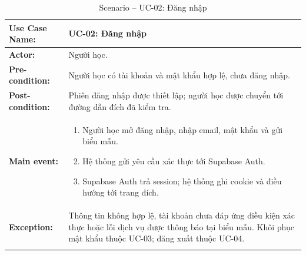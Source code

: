 \documentclass[12pt,a4paper,oneside]{report}
\newenvironment{luongusecase}{%
    \begin{enumerate}[leftmargin=1.6em,topsep=0pt,itemsep=0.25em,parsep=0pt]
}{\end{enumerate}}
\begin{document}
\begingroup
\renewcommand{\arraystretch}{1.15}
\setlength{\LTpre}{0.4em}
\setlength{\LTpost}{0.6em}
\begin{longtable}{|>{\raggedright\arraybackslash\bfseries}p{}|p{}|}
\hline
Use Case Name: & UC-02: Đăng nhập \\
\hline
Actor: & Người học. \\
\hline
Pre-condition: & Người học có tài khoản và mật khẩu hợp lệ, chưa đăng nhập. \\
\hline
Post-condition: & Phiên đăng nhập được thiết lập; người học được chuyển tới đường dẫn đích đã kiểm tra. \\
\hline
Main event: & \begin{luongusecase}
    \item Người học mở đăng nhập, nhập email, mật khẩu và gửi biểu mẫu.
    \item Hệ thống gửi yêu cầu xác thực tới Supabase Auth.
    \item Supabase Auth trả session; hệ thống ghi cookie và điều hướng tới trang đích.
\end{luongusecase} \\
\hline
Exception: & Thông tin không hợp lệ, tài khoản chưa đáp ứng điều kiện xác thực hoặc lỗi dịch vụ được thông báo tại biểu mẫu. Khôi phục mật khẩu thuộc UC-03; đăng xuất thuộc UC-04. \\
\hline
\caption{Scenario -- UC-02: Đăng nhập}\label{tab:uc-02}\\
\end{longtable}
\endgroup
\end{document}

